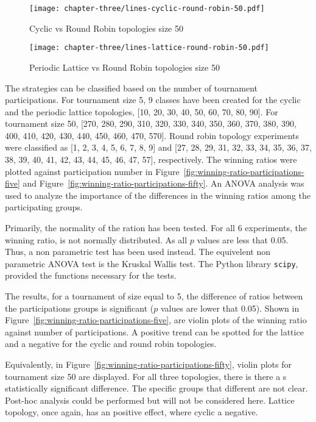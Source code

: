 \begin{figure}[H]
	\centering
	\texttt{[image: chapter-three/lines-cyclic-round-robin-50.pdf]}
	\caption{Cyclic vs Round Robin topologies size 50}
	\label{fig:winning-rankings-fifty-c-r}
\end{figure}

\begin{figure}[H]
	\centering
	\texttt{[image: chapter-three/lines-lattice-round-robin-50.pdf]}
	\caption{Periodic Lattice vs Round Robin topologies size 50}
	\label{fig:winning-rankings-fifty-l-r}
\end{figure}

The strategies can be classified based on the number of tournament
participations. For tournament size 5, 9 classes have been created for
the cyclic and the periodic lattice topologies, [10, 20, 30, 40, 50, 60, 70, 80, 90].
For tournament
size 50, [270, 280, 290, 310, 320, 330, 340, 350, 360, 370, 380, 390, 400, 410,
420, 430, 440, 450, 460, 470, 570]. Round robin topology
experiments were classified as [1, 2, 3, 4, 5, 6, 7, 8, 9] and
[27, 28, 29, 31, 32, 33, 34, 35, 36, 37, 38, 39, 40, 41, 42, 43, 44, 45, 46, 47, 57],
respectively. The winning ratios were plotted against participation number
in Figure~\ref{fig:winning-ratio-participations-five} and Figure~\ref{fig:winning-ratio-participations-fifty}.
An ANOVA analysis was used to analyze the importance of the
differences in the winning ratios among the participating groups.

Primarily, the normality of the ration has been tested. For all 6 experiments,
the winning ratio, is not normally distributed. As all \(p\) values are
less that 0.05. Thus, a non parametric test has been used instead. The equivelent
non parametric ANOVA test is the Kruskal Wallis test. The Python library
\texttt{scipy}, provided the functions necessary for the tests.

The results, for a tournament of size equal to 5, the difference
of ratios between the participations groups is significant (\(p\) values
are lower that 0.05). Shown in Figure~\ref{fig:winning-ratio-participations-five},
are violin plots of the winning ratio against number of participations.
A positive trend can be spotted for the lattice and a negative for the cyclic
and round robin topologies.

Equivalently, in Figure~\ref{fig:winning-ratio-participations-fifty}, violin plots for
tournament size 50 are displayed. For all three topologies, there is there  a s
statistically significant difference. The specific groups that different are not
clear. Post-hoc analysis could be performed but will not be considered here.
Lattice topology, once again, has an positive effect, where cyclic a negative.

